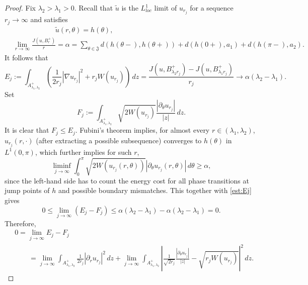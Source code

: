 \documentclass[leqno,11pt]{amsart}
\let\pa=\partial
\let\al=\alpha
\let\f=\frac
\let\pa=\partial
\let\na=\nabla
\theoremstyle{remark}
\newcommand{\tu}{\tilde{u}}
\begin{document}
\begin{proof}
    Fix $\lambda_2>\lambda_1>0$. Recall that $\tu$ is the $L^1_{loc}$ limit of $u_{r_j}$ for a sequence $r_j\to \infty$ and satisfies
    \begin{align*}
        &\qquad\qquad\qquad\tu(r,\theta)=h(\theta),\\
        &\lim\limits_{r\to\infty}\f{J(u,B_r^+)}{r}=\al=\sum_{\theta\in \mathfrak{J}}d(h(\theta-),h(\theta+)) + d(h(0+),a_1)+d(h(\pi-),a_2).
    \end{align*}
   It follows that 
    \begin{equation}\label{est:Ej}
        E_j:= \int_{A_{\lambda_1,\lambda_2}^+} \left(\f{1}{2r_j}|\na u_{r_j}|^2+r_jW(u_{r_j})\right)\,dz=\f{J(u,B_{\lambda_2r_j}^+)-J(u,B_{\lambda_1r_j}^+)}{r_j} \longrightarrow \al(\lambda_2-\lambda_1). 
    \end{equation}
    Set 
    \begin{equation*}
        F_j:= \int_{A_{\lambda_1,\lambda_2}^+} \sqrt{2W(u_{r_j})}\f{|\pa_\theta u_{r_j}|}{|z|}\,dz.
    \end{equation*}
    It is clear that $F_j\leq E_j$. Fubini's theorem implies, for almost every $r\in (\lambda_1,\lambda_2)$, $u_{r_j}(r,\cdot)$ (after extracting a possible subsequence) converges to $h(\theta)$ in $L^1(0,\pi)$, which further implies for such $r$, 
    \begin{equation*}
        \liminf_{j\to\infty} \int_0^\pi \sqrt{2W(u_{r_j}(r,\theta))}|\pa_\theta u_{r_j}(r,\theta)|\,d\theta\geq \al, 
    \end{equation*}
    since the left-hand side has to count the energy cost for all phase transitions at jump points of $h$ and possible boundary mismatches. This together with \eqref{est:Ej} gives
    \begin{equation*}
        0\leq \lim\limits_{j\to\infty} (E_j-F_j)\leq \al(\lambda_2-\lambda_1)-\al(\lambda_2-\lambda_1)=0.
    \end{equation*}
    Therefore,
   \begin{equation}\label{equip 1}
   \begin{split}
       &0=\lim_{j\to\infty} E_j-F_j\\
       &\qquad=\lim_{j\to\infty} \int_{A_{\lambda_1,\lambda_2}^+} \f{1}{2r_j}|\pa_r u_{r_j}|^2\,dz +\lim_{j\to\infty} \int_{A_{\lambda_1,\lambda_2}^+}\left|\f{1}{\sqrt{2r_j}}\f{|\pa_\theta u_{r_j}|}{|z|}- \sqrt{r_jW(u_{r_j})} \right|^2\,dz.
       \end{split}
   \end{equation}

\end{proof}
\end{document}

